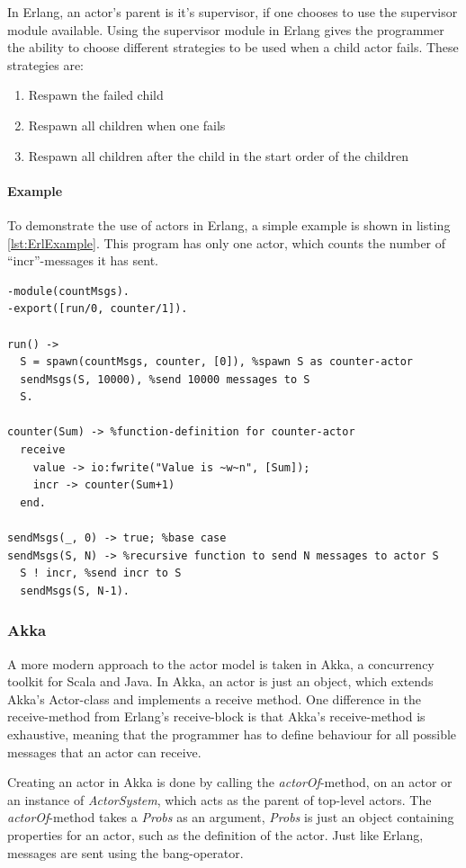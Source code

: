 In Erlang, an actor's parent is it's supervisor, if one chooses to use the supervisor module available. Using the supervisor module in Erlang gives the programmer the ability to choose different strategies to be used when a child actor fails. These strategies are:
\begin{enumerate}
  \item Respawn the failed child
  \item Respawn all children when one fails
  \item Respawn all children after the child in the start order of the children
\end{enumerate}

\paragraph{Example}
To demonstrate the use of actors in Erlang, a simple example is shown in listing \ref{lst:ErlExample}. This program has only one actor, which counts the number of \enquote{incr}-messages it has sent.

\begin{lstlisting}[style=erlang, caption={A simple message-counter in Erlang.}, label=lst:ErlExample]
-module(countMsgs).
-export([run/0, counter/1]).

run() ->
  S = spawn(countMsgs, counter, [0]), %spawn S as counter-actor
  sendMsgs(S, 10000), %send 10000 messages to S
  S.
  
counter(Sum) -> %function-definition for counter-actor
  receive
    value -> io:fwrite("Value is ~w~n", [Sum]);
    incr -> counter(Sum+1)
  end.

sendMsgs(_, 0) -> true; %base case
sendMsgs(S, N) -> %recursive function to send N messages to actor S
  S ! incr, %send incr to S
  sendMsgs(S, N-1).
\end{lstlisting}

\subsubsection{Akka}
A more modern approach to the actor model is taken in Akka, a concurrency toolkit for Scala and Java.
In Akka, an actor is just an object, which extends Akka's Actor-class and implements a receive method. One difference in the receive-method from Erlang's receive-block is that Akka's receive-method is exhaustive, meaning that the programmer has to define behaviour for all possible messages that an actor can receive. 

Creating an actor in Akka is done by calling the \emph{actorOf}-method, on an actor or an instance of \emph{ActorSystem}, which acts as the parent of top-level actors. The \emph{actorOf}-method takes a \emph{Probs} as an argument, \emph{Probs} is just an object containing properties for an actor, such as the definition of the actor. Just like Erlang, messages are sent using the bang-operator.

